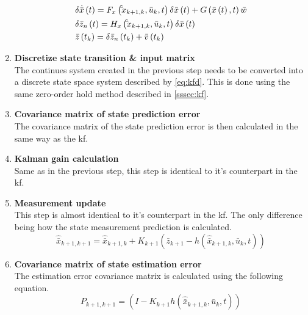 \begin{enumerate}
    \begin{equation}
        \begin{gathered}
            \delta \dot{\bar x}\left( t \right) = {F_x}\left( {{{\hat \bar x}_{k + 1,k}},{{\bar u}_k},t} \right)\delta \bar x\left( t \right) + G\left( {\bar x\left( t \right),t} \right)\bar w \hfill \\
            \delta {{\bar z}_n}\left( t \right) = {H_x}\left( {{{\hat \bar x}_{k + 1,k}},{{\bar u}_k},t} \right)\delta \bar x\left( t \right) \hfill \\
            \bar z\left( {{t_k}} \right) = \delta {{\bar z}_n}\left( {{t_k}} \right) + \bar v\left( {{t_k}} \right) \hfill \\ 
          \end{gathered}
    \end{equation}
    \item \textbf{Discretize state transition \& input matrix}\\
    The continues system created in the previous step needs to be converted into a discrete state space system described by \autoref{eq:kfd}. This is done using the same zero-order hold method described in \autoref{sssec:kf}.
    \item \textbf{Covariance matrix of state prediction error}\\
    The covariance matrix of the state prediction error is then calculated in the same way as the \gls{kf}.
    \item \textbf{Kalman gain calculation}\\
    Same as in the previous step, this step is identical to it's counterpart in the \gls{kf}.
    \item \textbf{Measurement update}\\
    This step is almost identical to it's counterpart in the \gls{kf}. The only difference being how the state measurement prediction is calculated.
    \begin{equation}
        {{\hat{\bar x}}_{k + 1,k + 1}} = {{\hat{\bar x}}_{k + 1,k}} + {K_{k + 1}}\left( {{{\bar z}_{k + 1}} - h\left( {{{\hat{\bar x}}_{k + 1,k}},{{\bar u}_k},t} \right)} \right)
    \end{equation}
    \item \textbf{Covariance matrix of state estimation error}\\
    The estimation error covariance matrix is calculated using the following equation.
    \begin{equation}
        {P_{k + 1,k + 1}} = \left( {I - {K_{k + 1}}h\left( {{{\hat{\bar x}}_{k + 1,k}},{{\bar u}_k},t} \right)} \right)
    \end{equation}
\end{enumerate}
